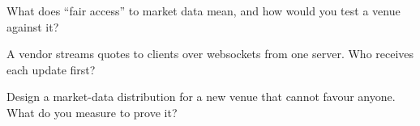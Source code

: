 \begin{interviewq}\label{iq:nw:the-asia-pacific-map:4}
What does ``fair access'' to market data mean, and how would you test a venue against it?
\end{interviewq}

\begin{interviewq}\label{iq:nw:the-asia-pacific-map:5}
A vendor streams quotes to clients over websockets from one server. Who receives each update first?
\end{interviewq}

\begin{interviewq}\label{iq:nw:the-asia-pacific-map:6}
Design a market-data distribution for a new venue that cannot favour anyone. What do you measure to prove it?
\end{interviewq}
